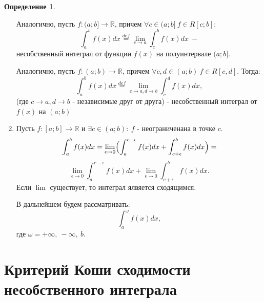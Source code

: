 \documentclass{report}
\theoremstyle{definition}
\newtheorem*{definition}{Определение}
\begin{document}
\begin{definition}
\begin{enumerate}
                                  Аналогично, пусть $f:(a;b]\rightarrow\mathbb{R}$, причем $\forall c \in (a;b] \ f\in R[c;b]$:
              \begin{equation*}
                  \int_{a}^{b}f(x)dx \overset{def}{=} \underset{c\rightarrow a}{\lim}\int_{c}^{b}f(x)dx \ -
              \end{equation*}
              несобственный интеграл от функции $f(x)$ на полуинтервале $(a;b]$.

              Аналогично, пусть $f:(a;b)\rightarrow\mathbb{R}$, причем $\forall c,d \in (a;b) \ f\in R[c,d]$.
              Тогда:
              \begin{equation*}
                  \int_{a}^{b}f(x)dx \overset{def}{=} \underset{c\rightarrow a,d\rightarrow b}{\lim}\int_{c}^{d}
                  f(x)dx,
              \end{equation*}
              (где $c\rightarrow a,d\rightarrow b$ - независимые друг от друга) - несобственный интеграл от $f(x)$
              на $(a;b)$

        \item Пусть $f:[a;b]\rightarrow\mathbb{R}$ и $\exists c \in (a;b): \ f$ - неограниченана в точке $c$.
              \begin{equation*}
                  \int_{a}^{b} f(x) dx = \underset{\epsilon\rightarrow0}{\lim} \Bigl(\int_{a}^{c - \epsilon} f(x)dx + \int_{c+\epsilon}^{b}f(x)dx \Bigr) =
              \end{equation*}
              \begin{equation*}
                  \underset{\epsilon\rightarrow0}{\lim}\int_{a}^{c - \epsilon} f(x)dx + \underset{\epsilon\rightarrow0}{\lim}
                  \int_{c+\epsilon}^{b}f(x)dx.
              \end{equation*}
              Если $\lim$ существует, то интеграл ялвяется сходящимся.

              В дальнейшем будем рассматривать:
              \begin{equation*}
                  \int_{a}^{\omega}f(x)dx,
              \end{equation*}
              где $\omega = +\infty, \ -\infty, \ b$.
    \end{enumerate}
\end{definition}

\section{Критерий Коши сходимости несобственного интеграла}
\end{document}
